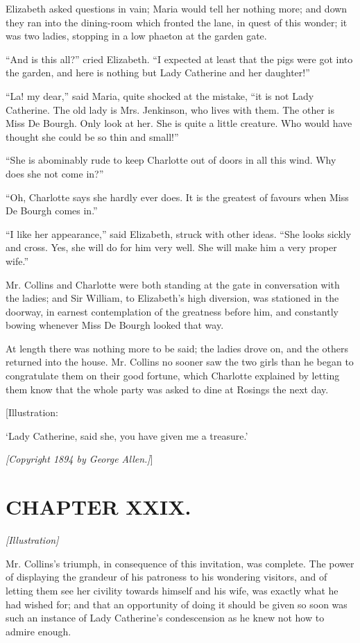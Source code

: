 \documentclass[12pt]{book}
\begin{document}
Elizabeth asked questions in vain; Maria would tell her nothing more; and down they ran into the dining-room which fronted the lane, in quest of this wonder; it was two ladies, stopping in a low phaeton at the garden gate.

``And is this all?'' cried Elizabeth. ``I expected at least that the pigs were got into the garden, and here is nothing but Lady Catherine and her daughter!''

``La! my dear,'' said Maria, quite shocked at the mistake, ``it is not Lady Catherine. The old lady is Mrs. Jenkinson, who lives with them. The other is Miss De Bourgh. Only look at her. She is quite a little creature. Who would have thought she could be so thin and small!''

``She is abominably rude to keep Charlotte out of doors in all this wind. Why does she not come in?''

``Oh, Charlotte says she hardly ever does. It is the greatest of favours when Miss De Bourgh comes in.''

``I like her appearance,'' said Elizabeth, struck with other ideas. ``She looks sickly and cross. Yes, she will do for him very well. She will make him a very proper wife.''

Mr. Collins and Charlotte were both standing at the gate in conversation with the ladies; and Sir William, to Elizabeth's high diversion, was stationed in the doorway, in earnest contemplation of the greatness before him, and constantly bowing whenever Miss De Bourgh looked that way.

At length there was nothing more to be said; the ladies drove on, and the others returned into the house. Mr. Collins no sooner saw the two girls than he began to congratulate them on their good fortune, which Charlotte explained by letting them know that the whole party was asked to dine at Rosings the next day.

[Illustration:

`Lady Catherine, said she, you have given me a treasure.'

\emph{[\textit{Copyright 1894 by George Allen.}]}]

\chapter{CHAPTER XXIX.}

\emph{[Illustration]}

Mr. Collins's triumph, in consequence of this invitation, was complete. The power of displaying the grandeur of his patroness to his wondering visitors, and of letting them see her civility towards himself and his wife, was exactly what he had wished for; and that an opportunity of doing it should be given so soon was such an instance of Lady Catherine's condescension as he knew not how to admire enough.
\end{document}
